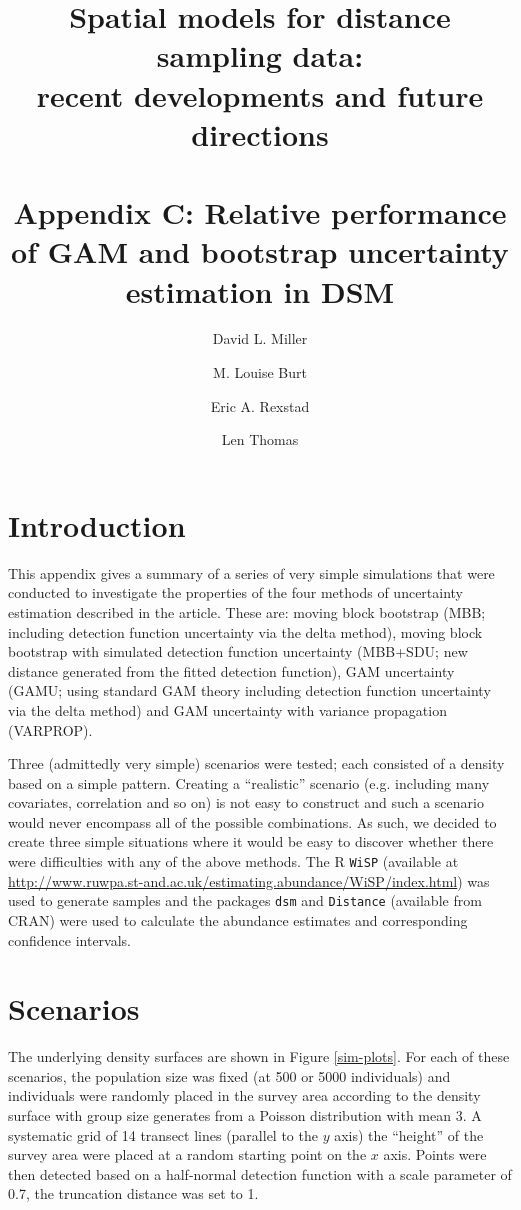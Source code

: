 \documentclass[11pt]{amsart}
\title{{\Small Spatial models for distance sampling data:\\ recent developments and future directions}\\ \mbox{} \\ Appendix C: Relative performance of GAM and bootstrap uncertainty estimation in DSM}
\author{David L. Miller \and
M. Louise Burt \and
Eric A. Rexstad \and 
Len Thomas}
\begin{document}
\maketitle


\section{Introduction}

This appendix gives a summary of a series of very simple simulations that were conducted to investigate the properties of the four methods of uncertainty estimation described in the article. These are: moving block bootstrap (MBB; including detection function uncertainty via the delta method), moving block bootstrap with simulated detection function uncertainty (MBB+SDU; new distance generated from the fitted detection function), GAM uncertainty (GAMU; using standard GAM theory including detection function uncertainty via the delta method) and GAM uncertainty with variance propagation (VARPROP).

Three (admittedly very simple) scenarios were tested; each consisted of a density based on a simple pattern. Creating a ``realistic'' scenario (e.g. including many covariates, correlation and so on) is not easy to construct and such a scenario would never encompass all of the possible combinations. As such, we decided to create three simple situations where it would be easy to discover whether there were difficulties with any of the above methods. The \textsf{R} \texttt{WiSP} (available at \url{http://www.ruwpa.st-and.ac.uk/estimating.abundance/WiSP/index.html}) was used to generate samples and the packages \texttt{dsm} and \texttt{Distance} (available from CRAN) were used to calculate the abundance estimates and corresponding confidence intervals.

\section{Scenarios}

The underlying density surfaces are shown in Figure \ref{sim-plots}. For each of these scenarios, the population size was fixed (at 500 or 5000 individuals) and individuals were randomly placed in the survey area according to the density surface with group size generates from a Poisson distribution with mean 3. A systematic grid of 14 transect lines (parallel to the $y$ axis) the ``height'' of the survey area were placed at a random starting point on the $x$ axis. Points were then detected based on a half-normal detection function with a scale parameter of 0.7, the truncation distance was set to 1.
\end{document}
